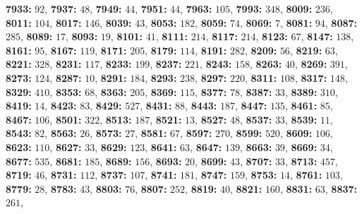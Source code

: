 \textsf{\bfseries 7933:} $92$, \textsf{\bfseries 7937:} $48$, \textsf{\bfseries 7949:} $44$, \textsf{\bfseries 7951:} $44$, \textsf{\bfseries 7963:} $105$, \textsf{\bfseries 7993:} $348$, \textsf{\bfseries 8009:} $236$, \textsf{\bfseries 8011:} $104$, \textsf{\bfseries 8017:} $146$, \textsf{\bfseries 8039:} $43$, \textsf{\bfseries 8053:} $182$, \textsf{\bfseries 8059:} $74$, \textsf{\bfseries 8069:} $7$, \textsf{\bfseries 8081:} $94$, \textsf{\bfseries 8087:} $285$, \textsf{\bfseries 8089:} $17$, \textsf{\bfseries 8093:} $19$, \textsf{\bfseries 8101:} $41$, \textsf{\bfseries 8111:} $214$, \textsf{\bfseries 8117:} $214$, \textsf{\bfseries 8123:} $67$, \textsf{\bfseries 8147:} $138$, \textsf{\bfseries 8161:} $95$, \textsf{\bfseries 8167:} $119$, \textsf{\bfseries 8171:} $205$, \textsf{\bfseries 8179:} $114$, \textsf{\bfseries 8191:} $282$, \textsf{\bfseries 8209:} $56$, \textsf{\bfseries 8219:} $63$, \textsf{\bfseries 8221:} $328$, \textsf{\bfseries 8231:} $117$, \textsf{\bfseries 8233:} $199$, \textsf{\bfseries 8237:} $221$, \textsf{\bfseries 8243:} $158$, \textsf{\bfseries 8263:} $40$, \textsf{\bfseries 8269:} $391$, \textsf{\bfseries 8273:} $124$, \textsf{\bfseries 8287:} $10$, \textsf{\bfseries 8291:} $184$, \textsf{\bfseries 8293:} $238$, \textsf{\bfseries 8297:} $220$, \textsf{\bfseries 8311:} $108$, \textsf{\bfseries 8317:} $148$, \textsf{\bfseries 8329:} $410$, \textsf{\bfseries 8353:} $68$, \textsf{\bfseries 8363:} $205$, \textsf{\bfseries 8369:} $115$, \textsf{\bfseries 8377:} $78$, \textsf{\bfseries 8387:} $33$, \textsf{\bfseries 8389:} $310$, \textsf{\bfseries 8419:} $14$, \textsf{\bfseries 8423:} $83$, \textsf{\bfseries 8429:} $527$, \textsf{\bfseries 8431:} $88$, \textsf{\bfseries 8443:} $187$, \textsf{\bfseries 8447:} $135$, \textsf{\bfseries 8461:} $85$, \textsf{\bfseries 8467:} $106$, \textsf{\bfseries 8501:} $322$, \textsf{\bfseries 8513:} $187$, \textsf{\bfseries 8521:} $13$, \textsf{\bfseries 8527:} $48$, \textsf{\bfseries 8537:} $33$, \textsf{\bfseries 8539:} $11$, \textsf{\bfseries 8543:} $82$, \textsf{\bfseries 8563:} $26$, \textsf{\bfseries 8573:} $27$, \textsf{\bfseries 8581:} $67$, \textsf{\bfseries 8597:} $270$, \textsf{\bfseries 8599:} $520$, \textsf{\bfseries 8609:} $106$, \textsf{\bfseries 8623:} $110$, \textsf{\bfseries 8627:} $33$, \textsf{\bfseries 8629:} $123$, \textsf{\bfseries 8641:} $63$, \textsf{\bfseries 8647:} $139$, \textsf{\bfseries 8663:} $39$, \textsf{\bfseries 8669:} $34$, \textsf{\bfseries 8677:} $535$, \textsf{\bfseries 8681:} $185$, \textsf{\bfseries 8689:} $156$, \textsf{\bfseries 8693:} $20$, \textsf{\bfseries 8699:} $43$, \textsf{\bfseries 8707:} $33$, \textsf{\bfseries 8713:} $457$, \textsf{\bfseries 8719:} $46$, \textsf{\bfseries 8731:} $112$, \textsf{\bfseries 8737:} $107$, \textsf{\bfseries 8741:} $181$, \textsf{\bfseries 8747:} $159$, \textsf{\bfseries 8753:} $14$, \textsf{\bfseries 8761:} $103$, \textsf{\bfseries 8779:} $28$, \textsf{\bfseries 8783:} $43$, \textsf{\bfseries 8803:} $76$, \textsf{\bfseries 8807:} $252$, \textsf{\bfseries 8819:} $40$, \textsf{\bfseries 8821:} $160$, \textsf{\bfseries 8831:} $63$, \textsf{\bfseries 8837:} $261$, 
